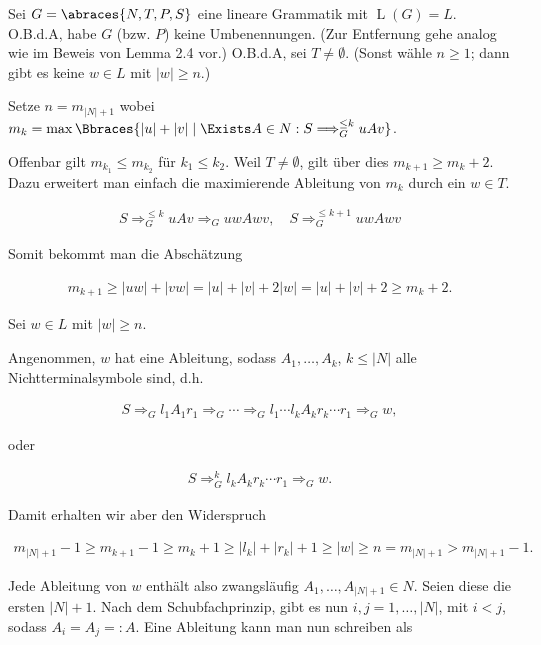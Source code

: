 \begin{solution}

Sei $G = \abraces{N, T, P, S}$ eine lineare Grammatik mit $\operatorname L(G) = L$.
O.B.d.A, habe $G$ (bzw. $P$) keine Umbenennungen.
(Zur Entfernung gehe analog wie im Beweis von Lemma 2.4 vor.)
O.B.d.A, sei $T \neq \emptyset$.
(Sonst wähle $n \geq 1$; dann gibt es keine $w \in L$ mit $|w| \geq n$.)

Setze $n = m_{|N| + 1}$ wobei $m_k = \max \Bbraces{|u| + |v| \mid \Exists A \in N: S \Longrightarrow_G^{\leq k} u A v}$.

Offenbar gilt $m_{k_1} \leq m_{k_2}$ für $k_1 \leq k_2$.
Weil $T \neq \emptyset$, gilt über dies $m_{k+1} \geq m_k + 2$.
Dazu erweitert man einfach die maximierende Ableitung von $m_k$ durch ein $w \in T$.

\begin{align*}
    S \Longrightarrow_G^{\leq k} u A v \Longrightarrow_G u w A w v,
    \quad
    S \Longrightarrow_G^{\leq k + 1} u w A w v
\end{align*}

Somit bekommt man die Abschätzung

\begin{align*}
    m_{k+1} \geq |u w| + |v w| = |u| + |v| + 2 |w| = |u| + |v| + 2 \geq m_k + 2.
\end{align*}

Sei $w \in L$ mit $|w| \geq n$.

Angenommen, $w$ hat eine Ableitung, sodass $A_1, \dots, A_k$, $k \leq |N|$ alle Nichtterminalsymbole sind, d.h.

\begin{align*}
    S \Longrightarrow_G l_1 A_1 r_1 \Longrightarrow_G \cdots \Longrightarrow_G l_1 \cdots l_k A_k r_k \cdots r_1 \Longrightarrow_G w,
\end{align*}

oder

\begin{align*}
    S \Longrightarrow_G^k l_k A_k r_k \cdots r_1 \Longrightarrow_G w.
\end{align*}

Damit erhalten wir aber den Widerspruch

\begin{align*}
    m_{|N| + 1} - 1 \geq m_{k+1} - 1 \geq m_k + 1 \geq |l_k| + |r_k| + 1 \geq |w| \geq n = m_{|N| + 1} > m_{|N| + 1} - 1.
\end{align*}

Jede Ableitung von $w$ enthält also zwangsläufig $A_1, \dots, A_{|N| + 1} \in N$.
Seien diese die ersten $|N| + 1$.
Nach dem Schubfachprinzip, gibt es nun $i, j = 1, \dots, |N|$, mit $i < j$, sodass $A_i = A_j =: A$.
Eine Ableitung kann man nun schreiben als


\end{solution}
